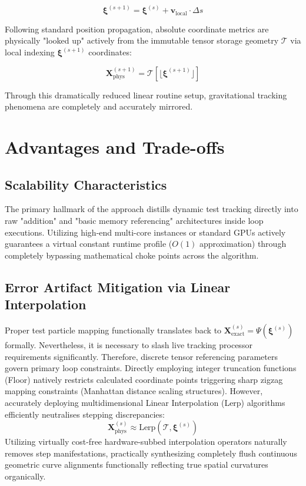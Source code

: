 \documentclass[11pt]{article}
\begin{document}
\[
\boldsymbol{\xi}^{(s+1)} = \boldsymbol{\xi}^{(s)} + \mathbf{v}_{\text{local}} \cdot \Delta s
\]

Following standard position propagation, absolute coordinate metrics are physically "looked up" actively from the immutable tensor storage geometry $\mathcal{T}$ via local indexing $\boldsymbol{\xi}^{(s+1)}$ coordinates:

\[
\mathbf{X}_{\text{phys}}^{(s+1)} = \mathcal{T} [\lfloor \boldsymbol{\xi}^{(s+1)} \rfloor ]
\]

Through this dramatically reduced linear routine setup, gravitational tracking phenomena are completely and accurately mirrored.

\section{Advantages and Trade-offs}

\subsection{Scalability Characteristics}
The primary hallmark of the approach distills dynamic test tracking directly into raw "addition" and "basic memory referencing" architectures inside loop executions. Utilizing high-end multi-core instances or standard GPUs actively guarantees a virtual constant runtime profile ($O(1)$ approximation) through completely bypassing mathematical choke points across the algorithm.

\subsection{Error Artifact Mitigation via Linear Interpolation}
Proper test particle mapping functionally translates back to $\mathbf{X}_{\text{exact}}^{(s)} = \Psi(\boldsymbol{\xi}^{(s)})$ formally. Nevertheless, it is necessary to slash live tracking processor requirements significantly. Therefore, discrete tensor referencing parameters govern primary loop constraints. Directly employing integer truncation functions (Floor) natively restricts calculated coordinate points triggering sharp zigzag mapping constraints (Manhattan distance scaling structures).
However, accurately deploying multidimensional Linear Interpolation (Lerp) algorithms efficiently neutralises stepping discrepancies:
\[
\mathbf{X}_{\text{phys}}^{(s)} \approx \mathrm{Lerp}(\mathcal{T}, \boldsymbol{\xi}^{(s)})
\]
Utilizing virtually cost-free hardware-subbed interpolation operators naturally removes step manifestations, practically synthesizing completely flush continuous geometric curve alignments functionally reflecting true spatial curvatures organically.
\end{document}
